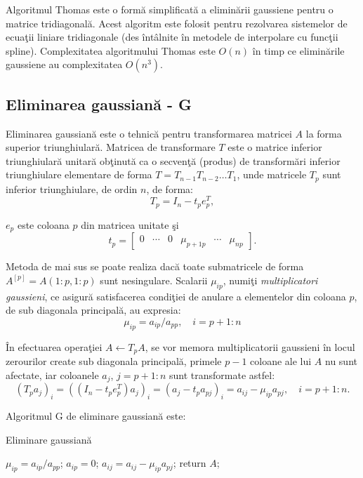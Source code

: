 \documentclass{exam}
\begin{document}
Algoritmul Thomas este o form\u{a} simplificat\u{a} a elimin\u{a}rii gaussiene pentru o matrice tridiagonal\u{a}. Acest algoritm este folosit pentru rezolvarea sistemelor de ecua\c{t}ii liniare tridiagonale (des \^{i}nt\^{a}lnite \^{i}n metodele de interpolare cu func\c{t}ii spline). Complexitatea algoritmului Thomas este $O(n)$ \^{i}n timp ce elimin\u{a}rile gaussiene au complexitatea $O(n^3)$.

\subsection{Eliminarea gaussian\u{a} - G}

\par Eliminarea gaussian\u{a} este o tehnic\u{a} pentru transformarea matricei $A$ la forma superior triunghiular\u{a}. Matricea de transformare $T$ este o matrice inferior triunghiular\u{a} unitar\u{a} ob\c{t}inut\u{a} ca o secven\c{t}\u{a} (produs) de transform\u{a}ri inferior triunghiulare elementare de forma $ T = T_{n-1} T_{n-2} \ldots T_1$, unde matricele $T_p$ sunt inferior triunghiulare, de ordin $n$, de forma:
$$T_p = I_n - t_p e_p^T,$$

\noindent $e_{p}$ este coloana $p$ din matricea unitate \c{s}i
$$t_p = \begin{bmatrix}0 & \cdots & 0 & \mu_{p+1p} & \cdots & \mu_{np}\end{bmatrix}.$$

Metoda de mai sus se poate realiza dac\u{a} toate submatricele de forma $A^{[p]}=A(1:p,1:p)$ sunt nesingulare. Scalarii $\mu_{ip}$, numi\c{t}i {\em multiplicatori gaussieni}, ce asigur\u{a} satisfacerea condi\c{t}iei de anulare a elementelor din coloana $p$, de sub diagonala principal\u{a}, au expresia:
$$\mu_{ip}=a_{ip}/a_{pp},\quad i=p+1:n$$

\^{I}n efectuarea opera\c{t}iei $A\leftarrow T_pA$, se vor memora multiplicatorii gaussieni în locul zerourilor create sub diagonala principal\u{a}, primele $p-1$ coloane ale lui $A$ nu sunt afectate, iar coloanele $a_j$, $j = p+1:n$ sunt transformate astfel:
$$(T_p a_j)_i = ((I_n - t_pe_p^T)a_j)_i = (a_j - t_p a_{pj})_i = a_{ij} - \mu_{ip} a_{pj}, \quad i=p+1:n.$$

Algoritmul G de eliminare gaussian\u{a} este:

\begin{algorithm}[H]
	\caption{Eliminare gaussian\u{a}}
	\label{g}
	\begin{algorithmic}[h]
		\State $\mu_{ip} = a_{ip}/a_{pp}$;
		\State $a_{ip} = 0$;
		\State $a_{ij} = a_{ij} - \mu_{ip} a_{pj}$;
		\EndFor
		\EndFor
		\EndFor
		\State return $A$;
		\EndProcedure
	\end{algorithmic}
\end{algorithm}
\end{document}
